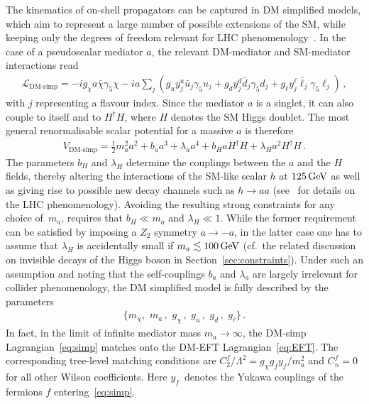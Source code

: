 \documentclass[a4paper, 11pt,notoc]{article}
\begin{document}
The kinematics of on-shell propagators can be captured in DM simplified models, which aim to represent a large number of possible extensions of the SM, while keeping only the degrees of freedom relevant for LHC phenomenology~\cite{Abdallah:2015ter,Abercrombie:2015wmb}. In the case of a pseudoscalar mediator $a$, the relevant DM-mediator and SM-mediator interactions read
\begin{align}\label{eq:simp}
\mathcal{L}_\text{DM-simp}=-i g_\chi a\bar \chi \gamma_5 \chi -i a \sum_j \left(g_u y_j^u \bar u_j \gamma_5 u_j + g_d y_j^d \bar d_j \gamma_5 d_j + g_\ell y_j^\ell \bar \ell_j\gamma_5 \ell_j  \right) \,,
\end{align}
with  $j$ representing a flavour index.  Since the mediator $a$ is a singlet, it can also couple to itself and to $H^\dagger H$, where $H$ denotes  the SM Higgs doublet. The most general renormalisable scalar potential for a massive $a$ is therefore
\begin{align}\label{eq:VaH}
V_\text{DM-simp} =\frac{1}{2}m_a^2 a^2 +  b_a a^3 + \lambda_a a^4 + b_{H} a H^\dagger H +\lambda_{H} a^2H^\dagger H \,.
\end{align}
The parameters $ b_{H}$  and $\lambda_{H}$ determine the couplings between the $a$ and the $H$ fields, thereby altering  the interactions  of the SM-like scalar $h$ at $125 \, {\rm GeV}$ as well as giving rise to possible new decay channels such as $h \to aa$ (see~\cite{Curtin:2013fra,Haisch:2018kqx} for details on the LHC phenomenology). Avoiding the resulting strong constraints for any choice of~$m_a$, requires that  $b_H \ll m_a $ and $\lambda_H \ll 1$. While the former requirement can be satisfied by imposing a $Z_2$ symmetry $a \to -a$, in the latter case one has to assume that $\lambda_H$ is accidentally small if $m_a \lesssim 100 \, {\rm GeV}$ (cf.~the related discussion on invisible decays of the Higgs boson in Section~\ref{sec:constraints}). Under such an assumption and noting that the self-couplings $b_a$ and $\lambda_a$ are largely irrelevant for collider phenomenology, the DM simplified model is  fully described by the parameters 
\begin{align}
\big\{ m_\chi, \,\, m_a\,,\,\, g_\chi\,, \,\, g_u\,,\,\,g_d\,,\,\, g_\ell \big\}\,. 
\end{align}
In fact, in the  limit of infinite mediator mass $m_a \to \infty$,  the DM-simp Lagrangian~\eqref{eq:simp} matches onto the DM-EFT Lagrangian~\eqref{eq:EFT}. The corresponding tree-level matching conditions are $C^f_2/\Lambda^2 = g_\chi g_f y_f  /m_a^2$ and $C_n^f=0$ for all other Wilson coefficients. Here $y_f$~denotes the Yukawa couplings of the fermions $f$ entering~\eqref{eq:simp}.
\end{document}
